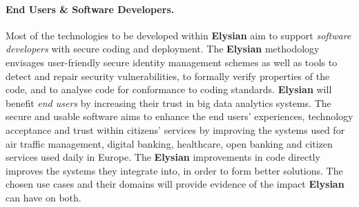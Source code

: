 \documentclass[a4paper,11pt]{article}
\newcommand{\project}[1]{\textbf{#1}\xspace}
\newcommand{\SECURITY}{\project{Elysian}}
\newcommand{\TheProject}{\SECURITY}
\begin{document}
\begin{mdframed}[backgroundcolor=blue!5]
\paragraph{End Users \& Software Developers.}
Most of the technologies to be developed within
\TheProject{}  aim to support \emph{software developers}
with secure coding and deployment. %
The \TheProject{} methodology envisages user-friendly secure identity management schemes as well as %
tools to detect and repair security vulnerabilities, to formally verify properties of the code, and to analyse code for conformance to coding standards. %
\TheProject{} will benefit \emph{end users} by increasing their trust in big data analytics systems.
The secure and usable software aims to enhance the end users' experiences, technology acceptance and trust within citizens' services by improving the systems used for air traffic management, digital banking, healthcare, open banking and citizen services used daily in Europe. The \TheProject{} improvements in code directly improves the systems they integrate into, in order to form better solutions.
The chosen use cases and their domains will provide evidence of the impact \TheProject{} can have on both.
\end{mdframed}


\end{document}
